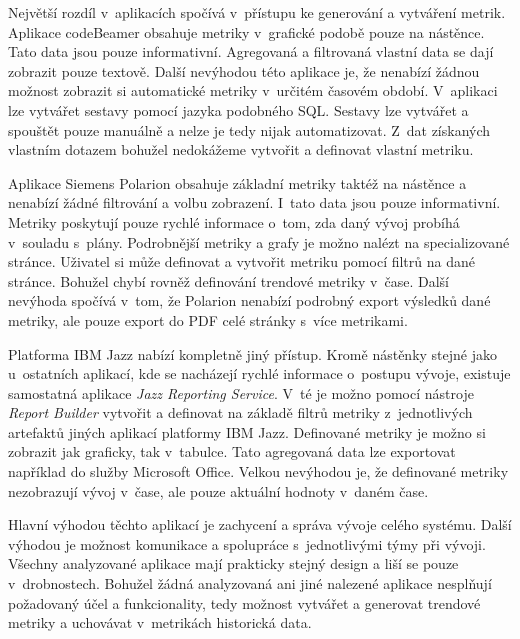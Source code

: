 \documentclass[czech,master]{diploma}
\begin{document}
Největší rozdíl v~aplikacích spočívá v~přístupu ke generování a vytváření metrik. Aplikace codeBeamer obsahuje metriky v~grafické podobě pouze na nástěnce. Tato data jsou pouze informativní. Agregovaná a filtrovaná vlastní data se dají zobrazit pouze textově. Další nevýhodou této aplikace je, že nenabízí žádnou možnost zobrazit si automatické metriky v~určitém časovém období. V~aplikaci lze vytvářet sestavy pomocí jazyka podobného SQL. Sestavy lze vytvářet a spouštět pouze manuálně a nelze je tedy nijak automatizovat. Z~dat získaných vlastním dotazem bohužel nedokážeme vytvořit a definovat vlastní metriku.

Aplikace Siemens Polarion obsahuje základní metriky taktéž na nástěnce a nenabízí žádné filtrování a volbu zobrazení. I~tato data jsou pouze informativní. Metriky poskytují pouze rychlé informace o~tom, zda daný vývoj probíhá v~souladu s~plány. Podrobnější metriky a grafy je možno nalézt na specializované stránce. Uživatel si může definovat a vytvořit metriku pomocí filtrů na dané stránce. Bohužel chybí rovněž definování trendové metriky v~čase. Další nevýhoda spočívá v~tom, že Polarion nenabízí podrobný export výsledků dané metriky, ale pouze export do PDF celé stránky s~více metrikami.

Platforma IBM Jazz nabízí kompletně jiný přístup. Kromě nástěnky stejné jako u~ostatních aplikací, kde se nacházejí rychlé informace o~postupu vývoje, existuje samostatná aplikace \textit{Jazz Reporting Service}. V~té je možno pomocí nástroje \textit{Report Builder} vytvořit a definovat na základě filtrů metriky z~jednotlivých artefaktů jiných aplikací platformy IBM Jazz. Definované metriky je možno si zobrazit jak graficky, tak v~tabulce. Tato agregovaná data lze exportovat například do služby Microsoft Office. Velkou nevýhodou je, že definované metriky nezobrazují vývoj v~čase, ale pouze aktuální hodnoty v~daném čase.

Hlavní výhodou těchto aplikací je zachycení a správa vývoje celého systému. Další výhodou je možnost komunikace a spolupráce s~jednotlivými týmy při vývoji. Všechny analyzované aplikace mají prakticky stejný design a liší se pouze v~drobnostech. Bohužel žádná analyzovaná ani jiné nalezené aplikace nesplňují požadovaný účel a funkcionality, tedy možnost vytvářet a generovat trendové metriky a uchovávat v~metrikách historická data.
\end{document}
